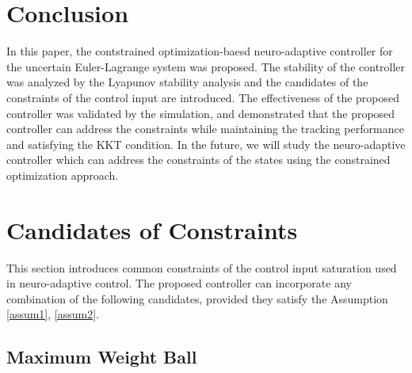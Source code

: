 \documentclass[lettersize,journal]{IEEEtran}
\begin{document}
\section{Conclusion}\label{sec:conclusion}

In this paper, the contstrained optimization-baesd neuro-adaptive controller for the uncertain Euler-Lagrange system was proposed.
The stability of the controller was analyzed by the Lyapunov stability analysis and the candidates of the constraints of the control input are introduced.
The effectiveness of the proposed controller was validated by the simulation, and demonstrated that the proposed controller can address the constraints while maintaining the tracking performance and satisfying the KKT condition.
In the future, we will study the neuro-adaptive controller which can address the constraints of the states using the constrained optimization approach.

 \appendices

 \section{Candidates of Constraints}\label{sec:cstr candidates} 

This section introduces common constraints of the control input saturation used in neuro-adaptive control. The proposed controller can incorporate any combination of the following candidates, provided they satisfy the Assumption \ref{assum1}, \ref{assum2}. 

\subsection{Maximum Weight Ball}\label{sec:cstr weight ball}
\end{document}
